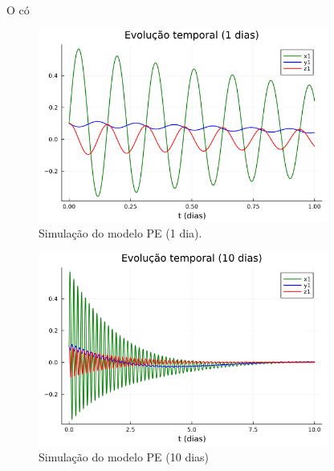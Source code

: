 O có
\begin{figure}[H]
  \centering
  \includegraphics[width=0.85\textwidth]{00_TCC/01_LATEX/figuras/ch01_lorenz_80/evolucao_temporal_01.png}
  \caption{Simulação do modelo PE (1 dia).\label{fig:lorenz80_pe_1}}
\end{figure}

\begin{figure}[H]
  \centering
    \includegraphics[width=0.85\textwidth]{00_TCC/01_LATEX/figuras/ch01_lorenz_80/evolucao_temporal_10.png}
  \caption{Simulação do modelo PE (10 dias)\label{fig:lorenz80_pe_2}}
\end{figure}

